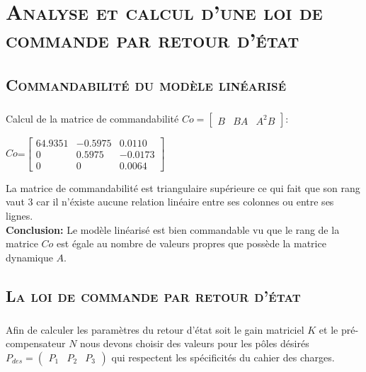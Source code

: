  \chapter{\textsc {Analyse et calcul d'une loi de commande par retour d'état} }
 
	\section{\textsc {Commandabilité du modèle linéarisé}} 
 	
 	\paragraph{}
 		Calcul de la matrice de commandabilité $Co=\begin{bmatrix} B&BA&A^{2}B \end{bmatrix} $:
 		
 		\begin{center}
			
			$Co$=$\begin{bmatrix}
			64.9351&-0.5975&0.0110\\
			0&0.5975&-0.0173\\
			0&0&0.0064
			\end{bmatrix}$	
			 			
		\end{center} 		 
		
		La matrice de commandabilité est triangulaire supérieure ce qui fait que son rang vaut 3 car il n'éxiste aucune relation linéaire entre ses colonnes ou entre ses lignes.\\
		\textbf{Conclusion:} Le modèle linéarisé est bien commandable vu que le rang de la matrice $Co$ est égale au nombre de valeurs propres que possède la matrice dynamique $A$. 
		
		\section{\textsc {La loi de commande par retour d'état}} 
		
		\begin{center}
		\label{fig1}
		\end{center}
		
		\paragraph{}
			Afin de calculer les paramètres du retour d'état soit le gain matriciel $K$ et le pré-compensateur $N$ nous devons choisir des valeurs pour les pôles désirés $P_{des}=\begin{pmatrix} P_1 & P_2 & P_3 \end{pmatrix} $ qui respectent les spécificités du cahier des charges.\\
		
